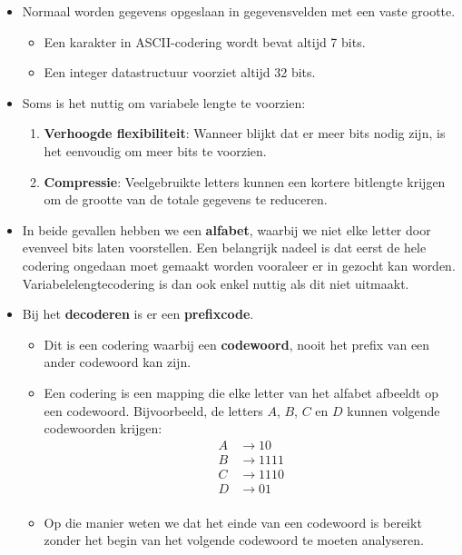 \begin{itemize}
    \item Normaal worden gegevens opgeslaan  in gegevensvelden met een vaste grootte.
    \begin{itemize}
        \item Een karakter in ASCII-codering wordt bevat altijd 7 bits.
        \item Een integer datastructuur voorziet altijd 32 bits.
    \end{itemize}
    \item Soms is het nuttig om variabele lengte te voorzien:
    \begin{enumerate}
        \item \textbf{Verhoogde flexibiliteit}: Wanneer blijkt dat er meer bits nodig zijn, is het eenvoudig om meer bits te voorzien. 
        \item \textbf{Compressie}: Veelgebruikte letters kunnen een kortere bitlengte krijgen om de grootte van de totale gegevens te reduceren.
    \end{enumerate}
    \item In beide gevallen hebben we een \textbf{alfabet}, waarbij we niet elke letter door evenveel bits laten voorstellen.
    \alert Een belangrijk nadeel is dat eerst de hele codering ongedaan moet gemaakt worden vooraleer er in gezocht kan worden. Variabelelengtecodering is dan ook enkel nuttig als dit niet uitmaakt.
    \item Bij het \textbf{decoderen} is er een \textbf{prefixcode}. 
    \begin{itemize}
        \item Dit is een codering waarbij een \textbf{codewoord}, nooit het prefix van een ander codewoord kan zijn.
        \item Een codering is een mapping die elke letter van het alfabet afbeeldt op een codewoord. Bijvoorbeeld, de letters $A$, $B$, $C$ en $D$ kunnen volgende codewoorden krijgen:
        \begin{align*}
            A &\rightarrow 10 \\
            B &\rightarrow 1111 \\
            C &\rightarrow 1110 \\
            D &\rightarrow 01 \\
        \end{align*}
        \item Op die manier weten we dat het einde van een codewoord is bereikt zonder het begin van het volgende codewoord te moeten analyseren.

\end{itemize}
\end{itemize}
